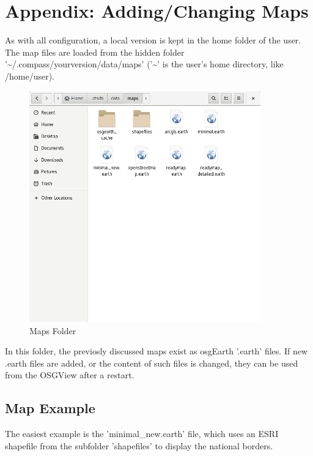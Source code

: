 \section{Appendix: Adding/Changing Maps}
\label{sec:appendix_maps}

As with all configuration, a local version is kept in the home folder of the user. The map files are loaded from the hidden folder '\textasciitilde/.compass/yourversion/data/maps' ('\textasciitilde' is the user's home directory, like /home/user).

\begin{figure}[H]
    \includegraphics[width=10cm,frame]{figures/osgview_maps_config.png}
  \caption{Maps Folder}
\end{figure}

In this folder, the previosly discussed maps exist as osgEarth '.earth' files. If new .earth files are added, or the content of such files is changed, they can be used from the OSGView after a restart.

\subsection{Map Example}
The easiest example is the 'minimal\_new.earth' file, which uses an ESRI shapefile from the subfolder 'shapefiles' to display the national borders.

